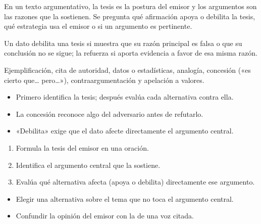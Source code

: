 \documentclass[10pt,a4paper,twocolumn]{article}
\begin{document}
En un texto argumentativo, la tesis es la postura del emisor y los argumentos son las razones que la sostienen. Se pregunta qué afirmación apoya o debilita la tesis, qué estrategia usa el emisor o si un argumento es pertinente.

Un dato debilita una tesis si muestra que su razón principal es falsa o que su conclusión no se sigue; la refuerza si aporta evidencia a favor de esa misma razón.

\begin{definicion}
Ejemplificación, cita de autoridad, datos o estadísticas, analogía, concesión («es cierto que\ldots{} pero\ldots{}»), contraargumentación y apelación a valores.
\end{definicion}

\begin{ideasclave}
\begin{itemize}
  \item Primero identifica la tesis; después evalúa cada alternativa contra ella.
  \item La concesión reconoce algo del adversario antes de refutarlo.
  \item «Debilita» exige que el dato afecte directamente el argumento central.
\end{itemize}
\end{ideasclave}

\begin{metodo}
\begin{enumerate}
  \item Formula la tesis del emisor en una oración.
  \item Identifica el argumento central que la sostiene.
  \item Evalúa qué alternativa afecta (apoya o debilita) directamente ese argumento.
\end{enumerate}
\end{metodo}

\begin{errorfrecuente}
\begin{itemize}
  \item Elegir una alternativa sobre el tema que no toca el argumento central.
  \item Confundir la opinión del emisor con la de una voz citada.
\end{itemize}
\end{errorfrecuente}
\end{document}
